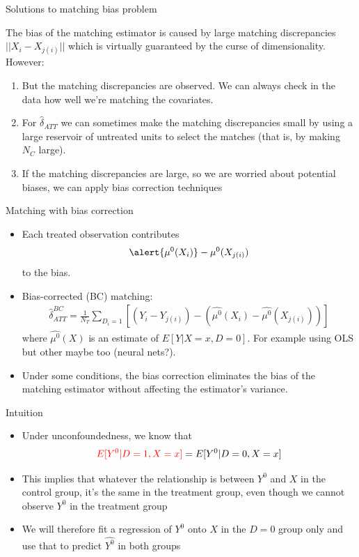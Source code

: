 \documentclass{beamer}
\begin{document}
\begin{frame}{Solutions to matching bias problem}
	
The bias of the matching estimator is caused by large matching discrepancies $||X_i - X_{j(i)}||$ which is virtually guaranteed by the curse of dimensionality.  However:
	\begin{enumerate}
	\item But the matching discrepancies are observed. We can always check in the data how well we're matching the covariates.

	\item For $\widehat{\delta}_{ATT}$ we can sometimes make the matching discrepancies small by using a large reservoir of untreated units to select the matches (that is, by making $N_C$ large).

  \item If the matching discrepancies are large, so we are worried about potential biases, we can apply bias correction techniques

	\end{enumerate}
\end{frame}

 
\begin{frame}{Matching with bias correction}
	
	\begin{itemize}
	\item Each treated observation contributes$$\alert{\mu^0(X_i)} - \mu^0(X_{j(i)})$$to the bias.
	\item Bias-corrected (BC) matching:
		\begin{eqnarray*}
		\widehat{\delta}_{ATT}^{BC} = \frac{1}{N_T} \sum_{D_i=1} \left[ (Y_i - Y_{j(i)}) - ( \widehat{\mu^0}(X_i) - \widehat{\mu^0}(X_{j(i)}) ) \right]
		\end{eqnarray*}where $\widehat{\mu^0}(X)$ is an estimate of $E[Y|X=x,D=0]$.  For example using OLS but other maybe too (neural nets?).  
	\item Under some conditions, the bias correction eliminates the bias of the matching estimator without affecting the estimator's variance.
	\end{itemize}
\end{frame}

\begin{frame}{Intuition}

\begin{itemize}
\item Under unconfoundedness, we know that $$\textcolor{red}{E[Y^0|D=1, X=x]} = E[Y^0|D=0, X=x]$$
\item This implies that whatever the relationship is between $Y^0$ and $X$ in the control group, it's the same in the treatment group, even though we cannot observe $Y^0$ in the treatment group
\item We will therefore fit a regression of $Y^0$ onto $X$ in the $D=0$ group only and use that to predict $\widehat{Y^0}$ in both groups
\end{itemize}

\end{frame}
\end{document}
